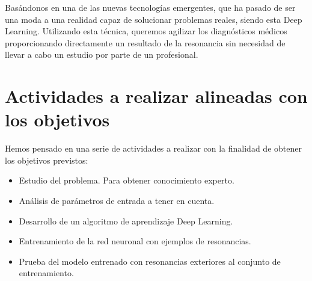 \documentclass[a4paper,12pt,oneside]{article}
\begin{document}
Basándonos en una de las nuevas tecnologías emergentes, que ha pasado de ser una moda a una realidad capaz de solucionar problemas reales, siendo esta Deep Learning. Utilizando esta técnica, queremos agilizar los diagnósticos médicos proporcionando directamente un resultado de la resonancia sin necesidad de llevar a cabo un estudio por parte de un profesional.

\section{Actividades a realizar alineadas con los objetivos}

Hemos pensado en una serie de actividades a realizar con la finalidad de obtener los objetivos previstos:

\begin{itemize}
	\item Estudio del problema. Para obtener conocimiento experto.
	\item Análisis de parámetros de entrada a tener en cuenta.
	\item Desarrollo de un algoritmo de aprendizaje Deep Learning.
	\item Entrenamiento de la red neuronal con ejemplos de resonancias.
	\item Prueba del modelo entrenado con resonancias exteriores al conjunto de entrenamiento.
\end{itemize}













\end{document}
